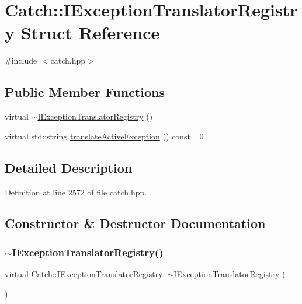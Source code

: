 \hypertarget{struct_catch_1_1_i_exception_translator_registry}{}\section{Catch\+:\+:I\+Exception\+Translator\+Registry Struct Reference}
\label{struct_catch_1_1_i_exception_translator_registry}


{\ttfamily \#include $<$catch.\+hpp$>$}

\subsection*{Public Member Functions}
\begin{DoxyCompactItemize}
\item 
virtual \hyperlink{struct_catch_1_1_i_exception_translator_registry_acf7402e18789ea46d54ea8564ac358d3}{$\sim$\+I\+Exception\+Translator\+Registry} ()
\item 
virtual std\+::string \hyperlink{struct_catch_1_1_i_exception_translator_registry_af76ae8c331a17f2a94c9720bc0d686bb}{translate\+Active\+Exception} () const =0
\end{DoxyCompactItemize}


\subsection{Detailed Description}


Definition at line 2572 of file catch.\+hpp.



\subsection{Constructor \& Destructor Documentation}
\hypertarget{struct_catch_1_1_i_exception_translator_registry_acf7402e18789ea46d54ea8564ac358d3}{}\label{struct_catch_1_1_i_exception_translator_registry_acf7402e18789ea46d54ea8564ac358d3} 
\subsubsection{\texorpdfstring{$\sim$\+I\+Exception\+Translator\+Registry()}{~IExceptionTranslatorRegistry()}}
{\footnotesize\ttfamily virtual Catch\+::\+I\+Exception\+Translator\+Registry\+::$\sim$\+I\+Exception\+Translator\+Registry (\begin{DoxyParamCaption}{ }\end{DoxyParamCaption})\hspace{0.3cm}{\ttfamily [virtual]}}



